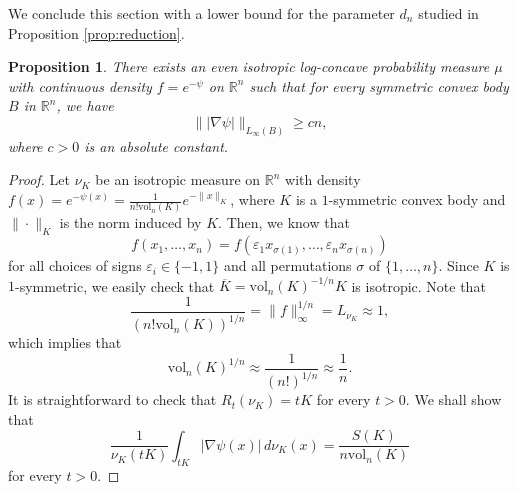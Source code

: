 \documentclass[11pt,leqno]{article}
\newtheorem{proposition}[theorem]{Proposition}
\theoremstyle{definition}
\theoremstyle{remark}
\numberwithin{equation}{section}
\newcommand{\gr}{\geqslant}
\renewcommand{\epsilon}{\varepsilon}
\newcommand{\1}{\textbf{1}}
\newcommand{\R}{\mathbb{R}}
\newcommand{\vol}{\mathrm{vol}}
\begin{document}
We conclude this section with a lower bound for the parameter $d_n$ studied in Proposition \ref{prop:reduction}.

\begin{proposition}\label{prop:lower-sup}There exists an even isotropic log-concave probability measure $\mu$ with continuous density $f=e^{-\psi}$ on $\mathbb{R}^n$ such that for every symmetric convex body $B$ in $\R^n$, we have
$$\big\||\nabla \psi|\big\|_{L_\infty(B)}\gr cn,$$
where $c>0$ is an absolute constant.
\end{proposition}

\begin{proof}Let $\nu_K$ be an isotropic measure on $\mathbb{R}^n$ with density $f(x)=e^{-\psi(x)}=\frac{1}{n!\vol_n(K)}e^{-\|x\|_K}$, where $K$ is a $1$-symmetric convex body
and $\|\cdot\|_K$ is the norm induced by $K$. Then, we know that
$$f(x_1,\ldots,x_n)=f(\epsilon_1 x_{\sigma(1)},\ldots,\epsilon_n x_{\sigma(n)})$$ 
for all choices of signs $\epsilon_i\in\{-1,1\}$ and all permutations $\sigma$ of $\{1,\ldots,n\}$. 
Since $K$ is $1$-symmetric, we easily check that $\overline{K}=\vol_n(K)^{-1/n}K$ is isotropic.
Note that 
$$\frac{1}{\left(n!\vol_n(K)\right)^{1/n}}=\|f\|_{\infty}^{1/n}=L_{\nu_K}\approx 1,$$
which implies that
$$\vol_n(K)^{1/n}\approx \frac{1}{(n!)^{1/n}}\approx \frac{1}{n}.$$
It is straightforward to check that $R_t(\nu_K)=tK$ for every $t>0$. We shall show that
\begin{equation}\label{eq:identity}\frac{1}{\nu_K(tK)}\int_{tK}|\nabla \psi(x)|\,d\nu_K(x) =\frac{S(K)}{n\vol_n(K)}\end{equation}
for every $t>0$.


\end{proof}
\end{document}
